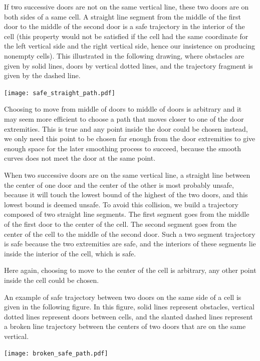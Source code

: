 \documentclass{easychair}
\begin{document}
If two successive doors are not on the same
vertical line, these two doors are on both sides of a same cell.  A
straight line segment from the middle of the first door to the middle of
the second door is a safe trajectory in the interior of the cell (this
property would not be satisfied if the cell had the same coordinate
for the left vertical side and the right vertical side, hence our insistence
on producing nonempty cells).  This illustrated in the following drawing,
where obstacles are given by solid lines, doors by vertical dotted lines,
and the trajectory fragment is given by the dashed line.

\begin{center}
\texttt{[image: safe\_straight\_path.pdf]}
\end{center}

Choosing to move from middle of doors to middle of doors is arbitrary
and it may seem more efficient to choose a path that moves closer to
one of the door extremities.  This is true and any point inside the
door could be chosen instead, we only need this point to be chosen far
enough from the door extremities to give enough space for the later
smoothing process to succeed, because the smooth curves does not meet
the door at the same point.

When two successive doors are on the same vertical line, a straight
line between the center of one door and the center of the other is
most probably unsafe, because it will touch the lowest bound of the
highest of the two doors, and this lowest bound is deemed unsafe.
To avoid this collision, we build a trajectory composed of
two straight line segments.  The first segment goes from the middle of
the first door to the center of the cell.  The second segment goes
from the center of the cell to the middle of the second door.  Such a
two segment trajectory is safe because the two extremities are safe, and the
interiors of these segments lie inside the interior of the cell, which is
safe.

Here again, choosing to move to the center of the cell is arbitrary,
any other point inside the cell could be chosen.

An example of safe trajectory between two doors on the same side of a cell is
given in the following figure.  In this figure, solid lines represent
obstacles, vertical dotted lines represent doors between cells, and
the slanted dashed lines represent a broken line trajectory between
the centers of two doors that are on the same vertical.
\begin{center}
\texttt{[image: broken\_safe\_path.pdf]}
\end{center}
\end{document}
